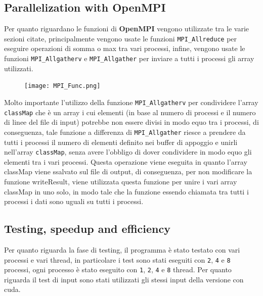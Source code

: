 \documentclass{article}
\begin{document}
  \subsection{Parallelization with OpenMPI}
  Per quanto riguardano le funzioni di \textbf{OpenMPI} vengono utilizzate tra le varie sezioni citate, principalmente vengono usate le funzioni \verb|MPI_Allreduce| per eseguire operazioni di somma o max tra vari processi, infine, vengono usate le funzioni \verb|MPI_Allgatherv| e \verb|MPI_Allgather| per 
  inviare a tutti i processi gli array utilizzati.

  \begin{figure}[ht]
    \centering
    \begin{minipage}{\textwidth}
      \centering
      \texttt{[image: MPI\_Func.png]}
    \end{minipage}
  \end{figure}
  Molto importante l'utilizzo della funzione \verb|MPI_Allgatherv| per condividere l'array \verb|classMap| che è un array i cui 
  elementi (in base al numero di processi e il numero di linee del file di input) potrebbe non essere divisi in modo equo tra i processi, di conseguenza, tale funzione a differenza di \verb|MPI_Allgather| riesce a prendere da tutti i processi 
  il numero di elementi definito nei buffer di appoggio e unirli nell'array \verb|classMap|, senza avere l'obbligo di dover condividere in modo equo gli elementi tra i vari processi. Questa operazione viene eseguita 
  in quanto l'array classMap viene ssalvato sul file di output, di conseguenza, per non modificare la funzione writeResult, viene utilizzata questa funzione per unire i vari array classMap in uno solo, in modo tale che la funzione 
  essendo chiamata tra tutti i processi i dati sono uguali su tutti i processi.

  \subsection{Testing, speedup and efficiency}

  Per quanto riguarda la fase di testing, il programma è stato testato con vari processi e vari thread, in particolare i test sono stati eseguiti con \verb|2|, \verb|4| e \verb|8| processi, ogni processo è stato eseguito con \verb|1|, \verb|2|, \verb|4| e \verb|8| thread.
  Per quanto riguarda il test di input sono stati utilizzati gli stessi input della versione con cuda.
\end{document}
